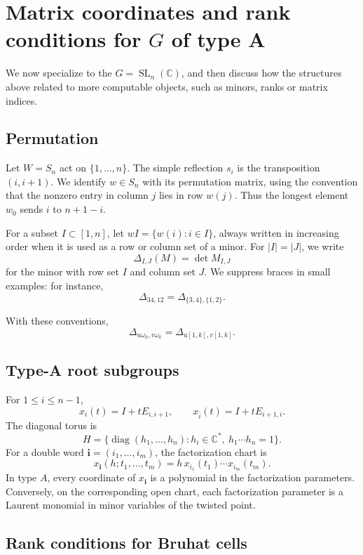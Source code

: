 \documentclass[12pt]{amsart}
\newcommand{\C}{\mathbb C}
\newcommand{\SL}{\operatorname{SL}}
\newcommand{\diag}{\operatorname{diag}}
\newcommand{\bi}{\mathbf i}
\theoremstyle{plain}
\theoremstyle{definition}
\theoremstyle{remark}
\begin{document}
\section{Matrix coordinates and rank conditions for \texorpdfstring{$G$}{G} of type A}\label{sec:typeA}

We now specialize to the $G=\SL_n(\C)$, and then discuss how the structures above related to more computable objects, such as minors, ranks or matrix indices.

\subsection{Permutation}

Let $W=S_n$ act on $\{1,\ldots,n\}$.  The simple reflection $s_i$ is the transposition $(i,i+1)$.  We identify $w\in S_n$ with its permutation matrix, using the convention that the nonzero entry in column $j$ lies in row $w(j)$.  Thus the longest element $w_0$ sends $i$ to $n+1-i$.

For a subset $I\subset[1,n]$, let $wI=\{w(i):i\in I\}$, always written in increasing order when it is used as a row or column set of a minor.  For $|I|=|J|$, we write
\[
   \Delta_{I,J}(M)=\det M_{I,J}
\]
for the minor with row set $I$ and column set $J$.  We suppress braces in small examples: for instance,
\[
   \Delta_{34,12}=\Delta_{\{3,4\},\{1,2\}}.
\]

With these conventions,
\[
   \Delta_{u\omega_k,v\omega_k}=\Delta_{u[1,k],v[1,k]}.
\]

\subsection{Type-A root subgroups}

For $1\leq i\leq n-1$,
\[
   x_i(t)=I+tE_{i,i+1},
   \qquad
   x_{\bar i}(t)=I+tE_{i+1,i}.
\]
The diagonal torus is
\[
   H=\{\diag(h_1,\ldots,h_n):h_i\in\C^*,\ h_1\cdots h_n=1\}.
\]
For a double word $\bi=(i_1,\ldots,i_m)$, the factorization chart is
\[
   x_\bi(h;t_1,\ldots,t_m)
      =h\,x_{i_1}(t_1)\cdots x_{i_m}(t_m).
\]
In type $A$, every coordinate of $x_\bi$ is a polynomial in the factorization parameters.  Conversely, on the corresponding open chart, each factorization parameter is a Laurent monomial in minor variables of the twisted point.

\subsection{Rank conditions for Bruhat cells}
\end{document}
